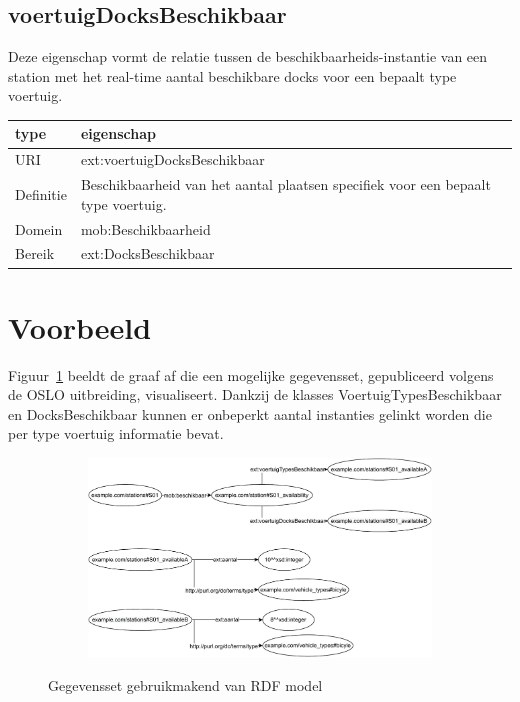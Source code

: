 \subsection{voertuigDocksBeschikbaar}
Deze eigenschap vormt de relatie tussen de beschikbaarheids-instantie van een station met het real-time aantal beschikbare docks voor een bepaalt type voertuig. 

\begin{table}[h]
\begin{tabular}{|l|l|}
\hline
\textbf{type}     & \textbf{eigenschap} \\ \hline
URI               & ext:voertuigDocksBeschikbaar \\ \hline
Definitie         & Beschikbaarheid van het aantal plaatsen specifiek voor een bepaalt type voertuig.  \\ \hline
Domein & mob:Beschikbaarheid \\ \hline
Bereik & ext:DocksBeschikbaar \\ \hline
\end{tabular}
\end{table}

\section{Voorbeeld}
Figuur~\ref{fig:rdf_gegevensset_voorbeeld} beeldt de graaf af die een mogelijke gegevensset, gepubliceerd volgens de OSLO uitbreiding, visualiseert. Dankzij de klasses VoertuigTypesBeschikbaar en DocksBeschikbaar kunnen er onbeperkt aantal instanties gelinkt worden die per type voertuig informatie bevat.

\begin{figure}[h]
	\centering
	\begin{subfigure}{\textwidth}
		\centering
		\centerline{
			\includegraphics[width=\textwidth]{images/rdf_dataset.pdf}
		}
	\end{subfigure}
	\caption{Gegevensset gebruikmakend van RDF model}
	\label{fig:rdf_gegevensset_voorbeeld}
\end{figure}